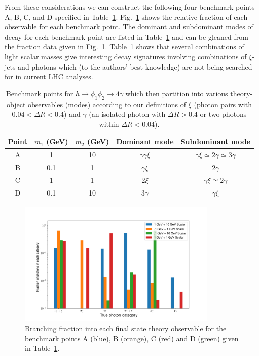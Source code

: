 \documentclass[letter,12pt]{article}
\begin{document}
From these considerations we can construct the following four benchmark points A, B, C, and D specified in Table~\ref{table:benchmarks}. Fig.~\ref{fig:toy_model_fractions} shows the relative fraction of each observable for each benchmark point. The dominant and subdominant modes of decay for each benchmark point are listed in Table~\ref{table:benchmarks} and can be gleaned from the fraction data given in Fig.~\ref{fig:toy_model_fractions}. Table~\ref{table:benchmarks} shows that several combinations of light scalar masses give interesting decay signatures involving combinations of $\xi$-jets and photons which (to the authors' best knowledge) are not being searched for in current LHC analyses.

\begin{table}[t]
\centering
\begin{tabular}{ccccc}
\hline\hline
Point & $m_1$ (GeV) & $m_2$ (GeV) & Dominant mode & Subdominant mode \\
\hline
A & 1 & 10 & $\gamma\gamma\xi$ & $\gamma\xi\simeq 2\gamma\simeq 3\gamma$ \\
B & 0.1 & 1 & $\gamma\xi$ & $2\gamma$ \\
C & 1 & 1 & $2\xi$ & $\gamma\xi\simeq 2\gamma$ \\
D & 0.1 & 10 & $3\gamma$ & $\gamma\xi$ \\
\hline\hline
\end{tabular}
\caption{Benchmark points for $h\to\phi_1\phi_2\to 4\gamma$ which then partition into various theory-object observables (modes) according to our definitions of $\xi$ (photon pairs with $0.04<\Delta R<0.4$) and $\gamma$ (an isolated photon with $\Delta R>0.4$ or two photons within $\Delta R<0.04$). }
\label{table:benchmarks}
\end{table}

\begin{figure}[t] 
\begin{center}
\includegraphics[width=0.85\textwidth]{toy_model_fractions.png} 
\caption{Branching fraction into each final state theory observable for the benchmark points A (blue), B (orange), C (red) and D (green) given in Table~\ref{table:benchmarks}.}
\label{fig:toy_model_fractions}
\end{center}
\end{figure}
\end{document}
